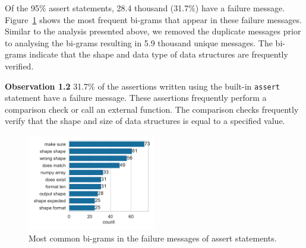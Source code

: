 \documentclass[smallextended]{svjour3}       %
\newcommand{\highlight}[1]{\begin{framed}%
  \noindent#1
\end{framed}}
\providecommand{\DIFaddbegin}{} %
\providecommand{\DIFaddend}{} %
\providecommand{\DIFdelbegin}{} %
\providecommand{\DIFdelend}{} %
\newcommand{\DIFscaledelfig}{0.5}
\newlength{\DIFdelgraphicswidth} %
\newlength{\DIFdelgraphicsheight} %
\newcommand{\DIFaddincludegraphics}[2][]{{\color{blue}\fbox{\DIFOincludegraphics[#1]{#2}}}} %
\newcommand{\DIFdelincludegraphics}[2][]{%
\sbox{\DIFdelgraphicsbox}{\DIFOincludegraphics[#1]{#2}}%
\settoboxwidth{\DIFdelgraphicswidth}{\DIFdelgraphicsbox} %
\settoboxtotalheight{\DIFdelgraphicsheight}{\DIFdelgraphicsbox} %
\scalebox{\DIFscaledelfig}{%
\parbox[b]{\DIFdelgraphicswidth}{\usebox{\DIFdelgraphicsbox}\\[-\baselineskip] \rule{\DIFdelgraphicswidth}{0em}}\llap{\resizebox{\DIFdelgraphicswidth}{\DIFdelgraphicsheight}{%
\setlength{\unitlength}{\DIFdelgraphicswidth}%
\begin{picture}(1,1)%
\thicklines\linethickness{2pt} %
{\color[rgb]{1,0,0}\put(0,0){\framebox(1,1){}}}%
{\color[rgb]{1,0,0}\put(0,0){\line( 1,1){1}}}%
{\color[rgb]{1,0,0}\put(0,1){\line(1,-1){1}}}%
\end{picture}%
}\hspace*{3pt}}} %
} %
\DeclareRobustCommand{\DIFaddbegin}{\DIFOaddbegin \let\includegraphics\DIFaddincludegraphics} %
\DeclareRobustCommand{\DIFaddend}{\DIFOaddend \let\includegraphics\DIFOincludegraphics} %
\DeclareRobustCommand{\DIFdelbegin}{\DIFOdelbegin \let\includegraphics\DIFdelincludegraphics} %
\DeclareRobustCommand{\DIFdelend}{\DIFOaddend \let\includegraphics\DIFOincludegraphics} %
\begin{document}
Of the 95\% assert statements, 28.4 thousand (31.7\%) have a failure message. Figure~\ref{fig:common-assert-msgs} shows the most frequent bi-grams that appear in these failure messages. Similar to the analysis presented above, we removed the duplicate messages prior to analysing the bi-grams resulting in 5.9 thousand unique messages. The bi-grams indicate that the shape and data type of data structures are frequently verified.

\DIFdelbegin %
\DIFdelend \DIFaddbegin \highlight{\textbf{Observation 1.2} 31.7\% of the assertions written using the built-in {\color{blue}%
\lstinline{assert} %
}%
statement have a failure message. These assertions frequently perform a comparison check or call an external function. The comparison checks frequently verify that the shape and size of data structures is equal to a specified value.}
\DIFaddend 

\begin{figure}
	\centering
	\includegraphics[width=0.5\textwidth]{common-assert-msgs.pdf}
	\caption{Most common bi-grams in the failure messages of assert statements.}
	\label{fig:common-assert-msgs}
\end{figure}
\end{document}
